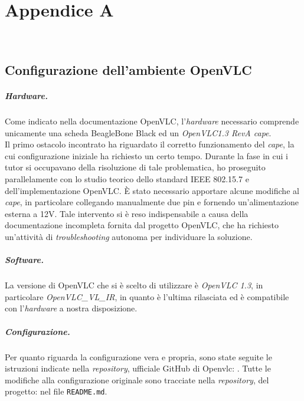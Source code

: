 \chapter{Appendice A}
\label{app:A}

\\

\section{Configurazione dell'ambiente OpenVLC}

\paragraph{Hardware.} Come indicato nella documentazione OpenVLC, l'\textit{hardware} necessario comprende unicamente una scheda BeagleBone Black ed un \textit{OpenVLC1.3 RevA cape}.\\
Il primo ostacolo incontrato ha riguardato il corretto funzionamento del \textit{cape}, la cui configurazione iniziale ha richiesto un certo tempo. Durante la fase in cui i tutor si occupavano della risoluzione di tale problematica, ho proseguito parallelamente con lo studio teorico dello standard IEEE 802.15.7 e dell'implementazione OpenVLC. È stato necessario apportare alcune modifiche al \textit{cape}, in particolare collegando manualmente due pin e fornendo un'alimentazione esterna a 12V. Tale intervento si è reso indispensabile a causa della documentazione incompleta fornita dal progetto OpenVLC, che ha richiesto un'attività di \textit{troubleshooting} autonoma per individuare la soluzione.
\paragraph{Software.} La versione di OpenVLC che si è scelto di utilizzare è \textit{OpenVLC 1.3}, in particolare \textit{OpenVLC\_VL\_IR}, in quanto è l'ultima rilasciata ed è compatibile con l'\textit{hardware} a nostra disposizione.

\paragraph{Configurazione.} Per quanto riguarda la configurazione vera e propria, sono state seguite le istruzioni indicate nella \textit{repository}, ufficiale GitHub di Openvlc: \cite{site:openvlc-github}. Tutte le modifiche alla configurazione originale sono tracciate nella \textit{repository}, del progetto: \cite{site:openvlc-pa-github} nel file \texttt{README.md}.

